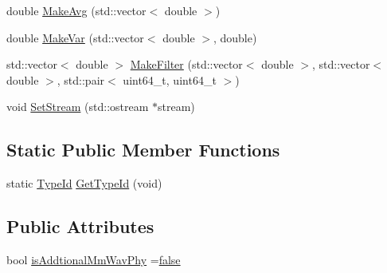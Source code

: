 \begin{DoxyCompactItemize}
\item 
double \hyperlink{classns3_1_1MmWaveEnbPhy_ac8702bd18540548b2b3c22e6f321f2d4}{Make\+Avg} (std\+::vector$<$ double $>$)
\item 
double \hyperlink{classns3_1_1MmWaveEnbPhy_ad8b13e8ca6de657b7a6ad79a7d2831d1}{Make\+Var} (std\+::vector$<$ double $>$, double)
\item 
std\+::vector$<$ double $>$ \hyperlink{classns3_1_1MmWaveEnbPhy_aa3e7651d7614326c712525bebb65066d}{Make\+Filter} (std\+::vector$<$ double $>$, std\+::vector$<$ double $>$, std\+::pair$<$ uint64\+\_\+t, uint64\+\_\+t $>$)
\item 
void \hyperlink{classns3_1_1MmWaveEnbPhy_a81c6a815d89901efeaa1abc450449ef3}{Set\+Stream} (std\+::ostream $\ast$stream)
\end{DoxyCompactItemize}
\subsection*{Static Public Member Functions}
\begin{DoxyCompactItemize}
\item 
static \hyperlink{classns3_1_1TypeId}{Type\+Id} \hyperlink{classns3_1_1MmWaveEnbPhy_a9d3cfef5a3c79b532d6f349898f69080}{Get\+Type\+Id} (void)
\end{DoxyCompactItemize}
\subsection*{Public Attributes}
\begin{DoxyCompactItemize}
\item 
bool \hyperlink{classns3_1_1MmWaveEnbPhy_a1a171ed81b1efedf963000d89f2cbd98}{is\+Addtional\+Mm\+Wav\+Phy} =\hyperlink{lte__cqi__generation_8m_ab1bef239d413c4da139c4bac92cd657a}{false}
\end{DoxyCompactItemize}
